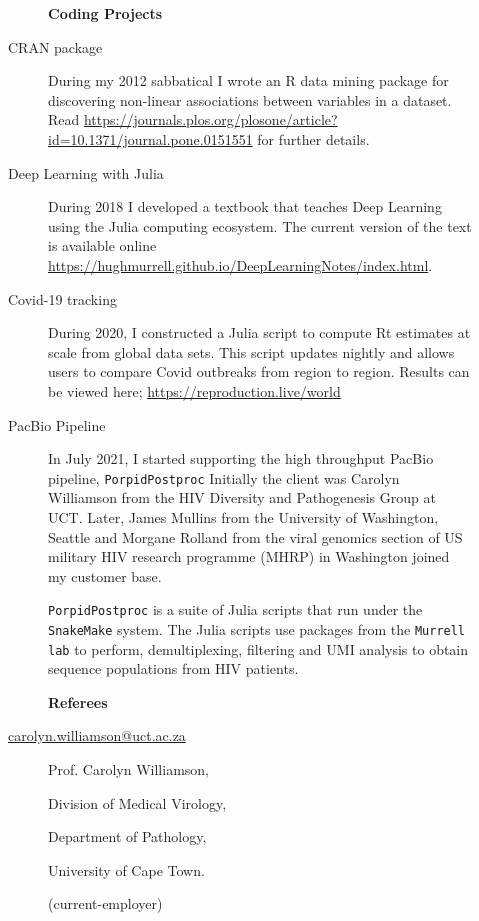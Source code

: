 \documentclass[12pt]{article}
\begin{document}
\newpage
\begin{multicols}{2}

\begin{description}\item[] \begin{description}\item[] {\large \bf  Coding Projects }
\item[CRAN package ]
	During my 2012 sabbatical I wrote an R data mining package for discovering
	non-linear associations between variables in a dataset. Read 
	\url{https://journals.plos.org/plosone/article?id=10.1371/journal.pone.0151551}       
	for further details.
\item[Deep Learning with Julia]
        During 2018 I developed a textbook 
        that teaches Deep Learning using the Julia computing ecosystem. 
        The current version of the text is available online \url{https://hughmurrell.github.io/DeepLearningNotes/index.html}.
\item[Covid-19 tracking ]
	During 2020, I constructed a Julia script
	to compute Rt estimates at scale from global data sets. This script updates
	nightly and allows users to compare Covid outbreaks from region to region.
	Results can be viewed here; \url{https://reproduction.live/world}
 \item[ PacBio Pipeline   ]  In July 2021, I started supporting the high throughput PacBio pipeline, {\tt PorpidPostproc}
 Initially the client was Carolyn Williamson from the HIV Diversity and Pathogenesis Group at UCT. 
 Later, James Mullins from the University of Washington, Seattle 
 and Morgane Rolland from the viral genomics section of US military HIV research programme (MHRP) in Washington
 joined my customer base. 
 
 {\tt PorpidPostproc} is a suite of Julia scripts that run under the {\tt SnakeMake} system. The Julia scripts use packages 
 from the {\tt Murrell lab} to perform, demultiplexing, filtering and UMI analysis to obtain sequence populations from HIV 
 patients.

 \end{description}
\end{description}


\begin{description}\item[] \begin{description}\item[] {\large \bf  Referees  }

\item[\url{carolyn.williamson@uct.ac.za}] 
 \item[] Prof. Carolyn Williamson, 
 \item[] Division of Medical Virology, 
 \item[] Department of Pathology, 
 \item[] University of Cape Town.
\item[] (current-employer)
\item[]


\end{description}
\end{description}
\end{multicols}
\end{document}
